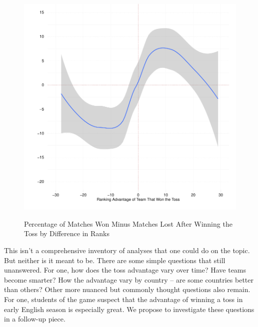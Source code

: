 \documentclass[11pt]{article}
\begin{document}
\begin{figure}[htbp]
\centering
\caption{Percentage of Matches Won Minus Matches Lost After Winning the Toss by Difference in Ranks}
\includegraphics[scale=.85]{../figs/winbyRank.pdf}
\label{fig:ranks}
\end{figure}

This isn't a comprehensive inventory of analyses that one could do on the topic. But neither is it meant to be. There are some simple questions that still unanswered. For one, how does the toss advantage vary over time? Have teams become smarter? How the advantage vary by country -- are some countries better than others? Other more nuanced but commonly thought questions also remain. For one, students of the game suspect that the advantage of winning a toss in early English season is especially great. We propose to investigate these questions in a follow-up piece.
\end{document}
